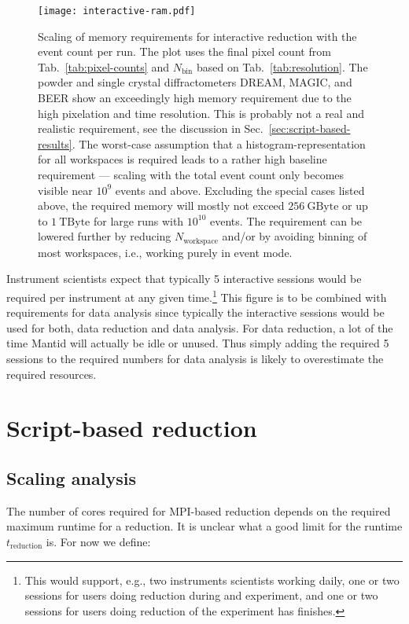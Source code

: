\documentclass[a4paper,english,numbers=noenddot,bibliography=totoc,chapterprefix=on,DIV=12]{scrartcl}
\newcommand{\Treduction}{t_{\text{reduction}}}
\newcommand{\Nbin}{N_{\text{bin}}}
\newcommand{\Nworkspace}{N_{\text{workspace}}}
\newcommand{\beer}{BEER\xspace}
\newcommand{\dream}{DREAM\xspace}
\newcommand{\magic}{MAGIC\xspace}
\newcommand{\mantid}{Mantid\xspace}
\begin{document}
\begin{figure}
  \centering
\texttt{[image: interactive-ram.pdf]}
\caption{\label{fig:interactive-ram}
Scaling of memory requirements for interactive reduction with the event count per run.
The plot uses the final pixel count from Tab.~\ref{tab:pixel-counts} and $\Nbin$ based on Tab.~\ref{tab:resolution}.
The powder and single crystal diffractometers \dream, \magic, and \beer show an exceedingly high memory requirement due to the high pixelation and time resolution.
This is probably not a real and realistic requirement, see the discussion in Sec.~\ref{sec:script-based-results}.
The worst-case assumption that a histogram-representation for all workspaces is required leads to a rather high baseline requirement --- scaling with the total event count only becomes visible near $10^9$ events and above.
Excluding the special cases listed above, the required memory will mostly not exceed $256~\mathrm{GByte}$ or up to $1~\mathrm{TByte}$ for large runs with $10^{10}$ events.
The requirement can be lowered further by reducing $\Nworkspace$ and/or by avoiding binning of most workspaces, i.e., working purely in event mode.
}
\end{figure}

Instrument scientists expect that typically 5 interactive sessions would be required per instrument at any given time.\footnote{This would support, e.g., two instruments scientists working daily, one or two sessions for users doing reduction during and experiment, and one or two sessions for users doing reduction of the experiment has finishes.}
This figure is to be combined with requirements for data analysis since typically the interactive sessions would be used for both, data reduction and data analysis.
For data reduction, a lot of the time \mantid will actually be idle or unused.
Thus simply adding the required 5 sessions to the required numbers for data analysis is likely to overestimate the required resources.




\section{Script-based reduction}


\subsection{Scaling analysis}
\label{sec:scaling-analysis}

The number of cores required for MPI-based reduction depends on the required maximum runtime for a reduction.
It is unclear what a good limit for the runtime $\Treduction$ is.
For now we define:
\end{document}
